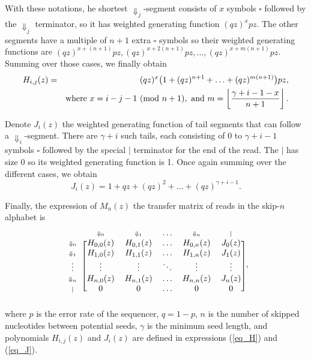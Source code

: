 \documentclass{article}
\newcommand{\Dn}[1]{\scriptstyle{\Downarrow_{#1}}}
\newcommand{\nd}{\scriptstyle{|}}
\newcommand{\modulo}[1]{\ (\mathrm{mod}\ #1)}
\begin{document}
With these notations, he shortest $\Downarrow_j$-segment consists of $x$
symbols $\square$ followed by the $\Downarrow_j$ terminator, so it has
weighted generating function $(qz)^xpz$. The other segments have a
multiple of $n+1$ extra $\square$ symbols so their weighted
generating functions are $(qz)^{x+(n+1)}pz, (qz)^{x+2(n+1)}pz, \ldots,
(qz)^{x+m(n+1)}pz$. Summing over those cases, we finally obtain
\begin{eqnarray}
\label{eq_H}
H_{i,j}(z) &=& (qz)^x \big( 1 + (qz)^{n+1} +
  \ldots + (qz)^{m(n+1)} \big)pz, \\
\notag
  &\;& \text{where } x = i-j-1 \modulo{n+1},
  \text{ and } m = \left\lfloor
  \frac{\gamma+i-1-x}{n+1} \right\rfloor.
\end{eqnarray}

Denote $J_i(z)$ the weighted generating function of tail segments that can
follow a $\Downarrow_i$-segment. There are $\gamma+i$ such tails, each
consisting of 0 to $\gamma+i-1$ symbols $\square$ followed by the special
$|$ terminator for the end of the read. The $|$ has size 0 so its weighted
generating function is 1. Once again summing over the different cases, we
obtain
\begin{equation}
\label{eq_J}
J_i(z) = 1 + qz + (qz)^2 + \ldots + (qz)^{\gamma+i-1}.
\end{equation}

Finally, the expression of $M_n(z)$ the transfer matrix of reads in the
skip-$n$ alphabet is
\begin{equation}
\label{eq_matrix_Mn}
\begin{blockarray}{cccccc}
   & \Dn{0} & \Dn{1} & \ldots & \Dn{n} & \nd \\
\begin{block}{c[ccccc]}
\Dn{0} & H_{0,0}(z) & H_{0,1}(z) & \ldots & H_{0,n}(z) & J_0(z) \\
\Dn{1} & H_{1,0}(z) & H_{1,1}(z) & \ldots & H_{1,n}(z) & J_1(z) \\
\vdots & \vdots & \vdots & \ddots & \vdots & \vdots \\
\Dn{n} & H_{n,0}(z) & H_{n,1}(z) & \ldots & H_{n,n}(z) & J_n(z) \\
\nd & 0 & 0 & \ldots & 0 & 0 \\
\end{block}
\end{blockarray},
\end{equation}
where $p$ is the error rate of the sequencer, $q=1-p$, $n$ is the number of
skipped nucleotides between potential seeds, $\gamma$ is the minimum seed
length, and polynomials $H_{i,j}(z)$ and $J_i(z)$ are defined in
expressions (\ref{eq_H}) and (\ref{eq_J}).
\end{document}
